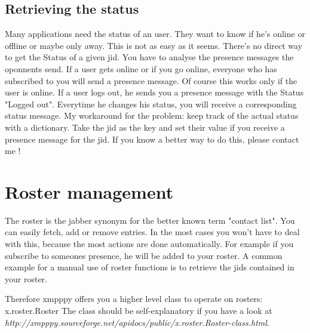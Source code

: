 \subsection{Retrieving the status}


Many applications need the status of an user. They want to know if he's online or offline or maybe only away.
This is not as easy as it seems. There's no direct way to get the Status of a given jid. You have to analyse the presence messages the oponnents send. If a user gets online or if you go online, everyone who has subscribed to you will send a presence message. Of course this works only if the user is online.
If a user logs out, he sends you a presence message with the Status "Logged out". Everytime he changes his status, you will receive a corresponding status message.
My workaround for the problem: keep track of the actual status with a dictionary. Take the jid as the key
and set their value if you receive a presence message for the jid.
\newline
\newline
If you know a better way to do this, please contact me !


\section{Roster management}
The roster is the jabber synonym for the better known term "contact list". You can easily fetch, add or remove entries.
In the most cases you won't have to deal with this, because the most actions are done automatically.
For example if you subscribe to someones presence, he will be added to your roster.
A common example for a manual use of roster functions is to retrieve the jids contained in your roster.

Therefore xmpppy offers you a higher level class to operate on rosters: x.roster.Roster
\newline
The class should be self-explanatory if you have a look at
\newline \textit{http://xmpppy.sourceforge.net/apidocs/public/x.roster.Roster-class.html}.